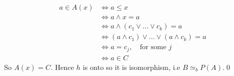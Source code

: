 \begin{myproof}
    \begin{align*}
        a\in A(x)&\Longleftrightarrow a\leq x\\
        &\Longleftrightarrow a\wedge x=a\\
        &\Longleftrightarrow a\wedge(c_1\vee\dots\vee c_k)=a\\
        &\Longleftrightarrow(a\wedge c_1)\vee\dots\vee(a\wedge c_k)=a\\
        &\Longleftrightarrow a=c_j,\quad\text{for some }j\\
        &\Longleftrightarrow a\in C
    \end{align*}
    So \(A(x)=C\). Hence \(h\) is onto so it is isomorphism, i.e \(B\simeq_b P(A)\).\qed
\end{myproof}
